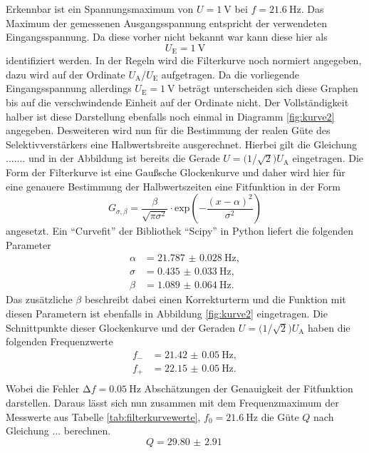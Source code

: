 Erkennbar ist ein Spannungsmaximum von $U = \SI{1}{\volt}$ bei $f = \SI{21.6}{\hertz}$. Das Maximum der gemessenen Ausgangsspannung entspricht der verwendeten Eingangsspannung. Da diese vorher nicht bekannt war kann diese hier als 
\begin{equation*}
U_{\text{E}} = \SI{1}{\volt}
\end{equation*}
identifiziert werden. In der Regeln wird die Filterkurve noch normiert angegeben, dazu wird auf der Ordinate $U_{\text{A}}$/$U_{\text{E}}$ aufgetragen. Da die vorliegende Eingangsspannung allerdings $U_{\text{E}} = \SI{1}{\volt}$ beträgt 
unterscheiden sich diese Graphen bis auf die verschwindende Einheit auf der Ordinate nicht. 
Der Vollständigkeit halber ist diese Darstellung ebenfalls noch einmal in Diagramm \ref{fig:kurve2} angegeben.
Desweiteren wird nun für die Bestimmung der realen Güte des Selektivverstärkers eine Halbwertsbreite ausgerechnet. Hierbei gilt die Gleichung .......
und in der Abbildung ist bereits die Gerade $U = (1$/$\sqrt{2}) U_{\text{A}}$ eingetragen. Die Form der Filterkurve ist eine Gaußsche Glockenkurve und daher wird hier für eine
genauere Bestimmung der Halbwertszeiten eine Fitfunktion in der Form \cite{gauss}
\begin{equation}
G_{\sigma, \beta} =  \frac{\beta}{\sqrt{\pi \sigma^2}} \cdot \text{exp}\left( -\frac{(x- \alpha)^2}{\sigma^2}\right)
\end{equation}
angesetzt.
Ein \enquote{Curvefit} der Bibliothek \enquote{Scipy} \cite{scipy} in Python liefert die folgenden Parameter
\begin{align*}
\alpha &= \SI{21.787(28)}{\hertz},\\ 
\sigma &= \SI{0.435(33)}{\hertz},\\
\beta  &= \SI{1.089(64)}{\hertz}.
\end{align*}
Das zusätzliche $\beta$ beschreibt dabei einen Korrekturterm und die Funktion mit diesen Parametern ist ebenfalls in Abbildung \ref{fig:kurve2} eingetragen. Die Schnittpunkte dieser Glockenkurve und der Geraden $U = (1$/$\sqrt{2}) U_{\text{A}}$ haben die folgenden Frequenzwerte
\begin{align*}
f_{-} &= \SI{21.42(5)}{\hertz},\\
f_{+} &= \SI{22.15(5)}{\hertz}.\\
\end{align*}
Wobei die Fehler $\increment f = \SI{0.05}{\hertz}$ Abschätzungen der Genauigkeit der Fitfunktion darstellen.
Daraus lässt sich nun zusammen mit dem Frequenzmaximum der Messwerte aus Tabelle \ref{tab:filterkurvewerte}, $f_{0} = \SI{21.6}{\hertz}$ die Güte $Q$ nach Gleichung ... berechnen.
\begin{equation}
Q = \SI{29.80(291)}{}
\end{equation}


